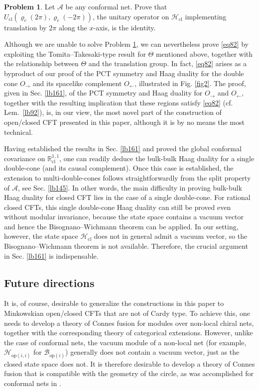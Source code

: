 \documentclass[11pt,b5paper,notitlepage]{article}
\theoremstyle{definition}
\newtheorem{prob}[df]{Problem}
\theoremstyle{plain}
\newcommand{\MA}{\mathcal A}
\newcommand{\Rcl}{\mathbb R^{1,1}_{\mathrm{cl}}}
\newcommand{\Hcl}{\mathcal H_{\mathrm{cl}}}
\newcommand{\Ucl}{U_{\mathrm{cl}}}
\newcommand{\Bopi}{\mathcal B_{\mathrm{op}(i)}}
\newcommand{\Hopii}{\mathcal H_{\mathrm{op}(i,i)}}
\numberwithin{equation}{section}
\begin{document}
\begin{prob}\label{lb162}
Let $\MA$ be any conformal net. Prove that  $\Ucl(\varrho_c(2\pi),\varrho_c(-2\pi))$, the unitary operator on $\Hcl$ implementing translation by $2\pi$ along the $x$-axis, is the identity.
\end{prob}


Although we are unable to solve Problem \ref{lb162}, we can nevertheless prove \eqref{eq82} by exploiting the Tomita--Takesaki-type result for $\Theta$ mentioned above, together with the relationship between $\Theta$ and the translation group. In fact, \eqref{eq82} arises as a byproduct of our proof of the PCT symmetry and Haag duality for the double cone $O_\rightarrow$ and its spacelike complement $O_\leftarrow$, illustrated in Fig. \ref{fig2}. The proof, given in Sec. \ref{lb161}, of the PCT symmetry and Haag duality for $O_\rightarrow$ and $O_\leftarrow$, together with the resulting implication that these regions satisfy \eqref{eq82} (cf. Lem.~\ref{lb92}), is, in our view, the most novel part of the construction of open/closed CFT presented in this paper, although it is by no means the most technical.



Having established the results in Sec. \ref{lb161} and proved the global conformal covariance on $\Rcl$, one can readily deduce the bulk-bulk Haag duality for a single double-cone (and its causal complement). Once this case is established, the extension to multi-double-cones follows straightforwardly from the split property of $\MA$, see Sec. \ref{lb145}. In other words, the main difficulty in proving bulk-bulk Haag duality for closed CFT lies in the case of a single double-cone. For rational closed CFTs, this single double-cone Haag duality can still be proved even without modular invariance, because the state space contains a vacuum vector and hence the Bisognano--Wichmann theorem can be applied. In our setting, however, the state space $\Hcl$ does not in general admit a vacuum vector, so the Bisognano--Wichmann theorem is not available. Therefore, the crucial argument in Sec. \ref{lb161} is indispensable.



\subsection{Future directions}


It is, of course, desirable to generalize the constructions in this paper to Minkowskian open/closed CFTs that are not of Cardy type. To achieve this, one needs to develop a theory of Connes fusion for modules over non-local chiral nets, together with the corresponding theory of categorical extensions. However, unlike the case of conformal nets, the vacuum module of a non-local net (for example, $\Hopii$ for $\Bopi$) generally does not contain a vacuum vector, just as the closed state space does not. It is therefore desirable to develop a theory of Connes fusion that is compatible with the geometry of the circle, as was accomplished for conformal nets in \cite{Gui21a,MS26a,MS26b}.
\end{document}
